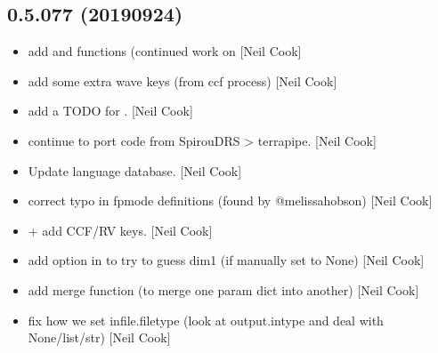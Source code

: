 \documentclass[a4paper,10pt,english]{report}
\begin{document}
\subsection{0.5.077 (2019\sphinxhyphen{}09\sphinxhyphen{}24)}
\label{\detokenize{misc/changelog:id84}}\begin{itemize}
\item {} 
 \sphinxhyphen{} add  and
 functions (continued work on  {[}Neil
Cook{]}

\item {} 
 \sphinxhyphen{} add some extra wave keys (from ccf process)
{[}Neil Cook{]}

\item {} 
 \sphinxhyphen{} add a TODO for . {[}Neil Cook{]}

\item {} 
 \sphinxhyphen{} continue to port code from SpirouDRS
\textendash{}\textgreater{} terrapipe. {[}Neil Cook{]}

\item {} 
Update language database. {[}Neil Cook{]}

\item {} 
 \sphinxhyphen{} correct typo in
 \sphinxhyphen{}fpmode definitions (found by @melissa\sphinxhyphen{}hobson) {[}Neil Cook{]}

\item {} 
 +  \sphinxhyphen{} add
CCF/RV keys. {[}Neil Cook{]}

\item {} 
 \sphinxhyphen{} add option in  to try
to guess dim1 (if manually set to None) {[}Neil Cook{]}

\item {} 
 \sphinxhyphen{} add merge function (to merge one
param dict into another) {[}Neil Cook{]}

\item {} 
 \sphinxhyphen{} fix how we set infile.filetype
(look at output.intype and deal with None/list/str) {[}Neil Cook{]}

\end{itemize}
\end{document}
